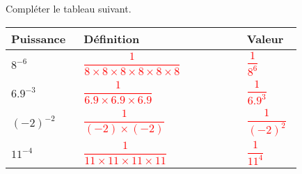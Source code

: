     Compléter le tableau suivant.
    \newcommand{\phantomRule}{\rule[-4.5mm]{0cm}{10mm}}

    \begin{tabular}{|>{\centering\arraybackslash}m{0.2\linewidth}|>{\centering\arraybackslash}m{0.5\linewidth}|>{\centering\arraybackslash}m{0.13\linewidth}|}
        \hline
        \rowcolor{gray!20}Puissance&Définition&Valeur\\\hline
        \phantomRule $8^{-6}$&\phantomRule\textcolor{red}{$\dfrac{1}{8\times 8\times 8\times 8\times 8\times 8}$}&\phantomRule\textcolor{red}{$\dfrac{1}{8^6}$} \\\hline
        \phantomRule $\num{6.9}^{-3}$&\phantomRule\textcolor{red}{$\dfrac{1}{\num{6.9}\times\num{6.9}\times\num{6.9}}$}&\phantomRule\textcolor{red}{$\dfrac{1}{\num{6.9}^3}$} \\\hline
        \phantomRule $(-2)^{-2}$&\phantomRule\textcolor{red}{$\dfrac{1}{(-2)\times(-2)}$}&\phantomRule\textcolor{red}{$\dfrac{1}{(-2)^2}$} \\\hline
        \phantomRule $11^{-4}$&\phantomRule\textcolor{red}{$\dfrac{1}{11\times 11\times 11\times 11}$}&\phantomRule\textcolor{red}{$\dfrac{1}{11^4}$} \\\hline
    \end{tabular}

